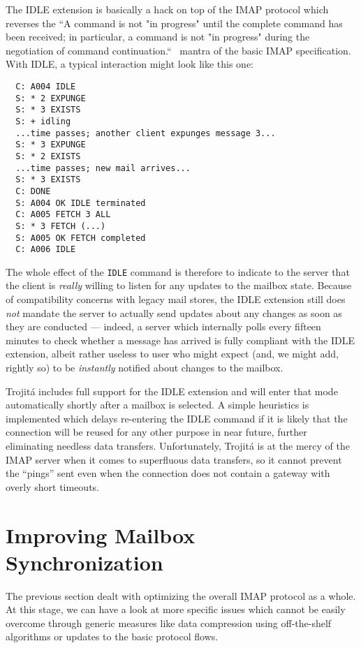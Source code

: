 \documentclass[trojita]{subfiles}
\begin{document}
The IDLE extension is basically a hack on top of the IMAP protocol which reverses the ``A command is not "in progress"
until the complete command has been received; in particular, a command is not "in progress" during the negotiation of
command continuation.``~\cite[p. 72]{rfc3501} mantra of the basic IMAP specification.  With IDLE, a typical interaction
might look like this one:

\begin{verbatim}
  C: A004 IDLE
  S: * 2 EXPUNGE
  S: * 3 EXISTS
  S: + idling
  ...time passes; another client expunges message 3...
  S: * 3 EXPUNGE
  S: * 2 EXISTS
  ...time passes; new mail arrives...
  S: * 3 EXISTS
  C: DONE
  S: A004 OK IDLE terminated
  C: A005 FETCH 3 ALL
  S: * 3 FETCH (...)
  S: A005 OK FETCH completed
  C: A006 IDLE
\end{verbatim}

The whole effect of the {\tt IDLE} command is therefore to indicate to the server that the client is {\em really}
willing to listen for any updates to the mailbox state.  Because of compatibility concerns with legacy mail stores, the
IDLE extension still does {\em not} mandate the server to actually send updates about any changes as soon as they are
conducted --- indeed, a server which internally polls every fifteen minutes to check whether a message has arrived is
fully compliant with the IDLE extension, albeit rather useless to user who might expect (and, we might add, rightly so)
to be {\em instantly} notified about changes to the mailbox.

Trojitá includes full support for the IDLE extension and will enter that mode automatically shortly after a mailbox is
selected.  A simple heuristics is implemented which delays re-entering the IDLE command if it is likely that the
connection will be reused for any other purpose in near future, further eliminating needless data transfers.
Unfortunately, Trojitá is at the mercy of the IMAP server when it comes to superfluous data transfers, so it cannot
prevent the ``pings'' sent even when the connection does not contain a gateway with overly short timeouts.

\section{Improving Mailbox Synchronization}

The previous section dealt with optimizing the overall IMAP protocol as a whole.  At this stage, we can have a look at
more specific issues which cannot be easily overcome through generic measures like data compression using off-the-shelf
algorithms or updates to the basic protocol flows.
\end{document}
